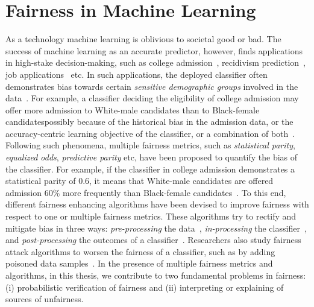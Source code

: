 \section{Fairness in Machine Learning}
As a technology machine learning is oblivious to societal good or bad. The success of machine learning as an accurate predictor, however, finds applications in high-stake decision-making, such as college admission~\cite{martinez2021using}, recidivism prediction~\cite{tollenaar2013method}, job applications~\cite{ajunwa2016hiring} etc. In such applications, the deployed  classifier often demonstrates bias towards certain \emph{sensitive demographic groups} involved in the data~\cite{dwork2012fairness}. For example, a classifier deciding the eligibility of college admission may offer more admission to White-male candidates than to Black-female candidates\textemdash possibly because of the historical bias in the admission data, or the accuracy-centric learning objective of the classifier, or a combination of both~\cite{berk2019accuracy,landy1978correlates,zliobaite2015relation}. Following such phenomena, multiple fairness metrics, such as \textit{statistical parity}, \textit{equalized odds}, \textit{predictive parity} etc, have been proposed to quantify the bias of the classifier. For example, if the classifier in college admission demonstrates a {statistical parity} of $ 0.6 $, it means that White-male candidates are offered admission $ 60\% $ more frequently than Black-female candidates~\cite{besse2021survey,feldman2015certifying,garg2020fairness}. To this end, different fairness enhancing algorithms have been devised to improve fairness with respect to one or multiple fairness metrics. These algorithms try to rectify and mitigate bias in three ways: \textit{pre-processing} the data~\cite{kamiran2012data,zemel2013learning,calmon2017optimized}, \textit{in-processing} the classifier~\cite{zhang2018mitigating}, and \textit{post-processing} the outcomes of a classifier~\cite{kamiran2012decision,hardt2016equality}. Researchers also study fairness attack algorithms to worsen the fairness of a classifier, such as by adding poisoned data samples~\cite{solans2020poisoning}. In the presence of multiple fairness metrics and algorithms, in this thesis, we contribute to two fundamental problems in fairness: (i) probabilistic verification of fairness and (ii) interpreting or explaining of sources of unfairness.


